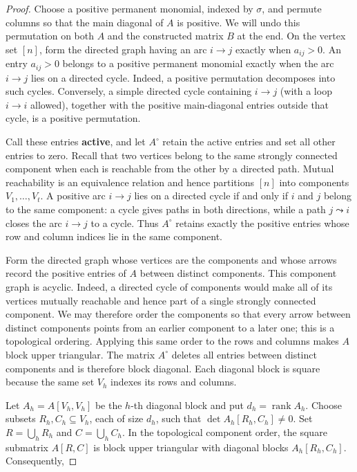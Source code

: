 \documentclass[11pt]{article}
\theoremstyle{remark}
\begin{document}
\begin{proof}
Choose a positive permanent monomial, indexed by \(\sigma\), and
permute columns so that the main diagonal of \(A\) is positive. We will undo
this permutation on both \(A\) and the constructed matrix \(B\) at the end.
On the vertex set \([n]\),
form the directed graph having an arc \(i\to j\) exactly when \(a_{ij}>0\). An entry
\(a_{ij}>0\) belongs to a positive permanent monomial exactly when the arc
\(i\to j\) lies on a directed cycle. Indeed, a positive permutation
decomposes into such cycles. Conversely, a simple directed cycle containing
\(i\to j\) (with a loop \(i\to i\) allowed), together with the positive
main-diagonal entries outside that cycle, is a positive permutation.

Call these entries \textbf{active}, and let \(A^\circ\) retain the active entries
and set all other entries to zero. Recall that two vertices belong to the
same strongly connected component when each is reachable from the other by
a directed path. Mutual reachability is an equivalence relation and hence
partitions \([n]\) into components \(V_1,\ldots,V_t\). A positive arc
\(i\to j\) lies on a directed cycle if and only if \(i\) and \(j\) belong
to the same component: a cycle gives paths in both directions, while a path
\(j\leadsto i\) closes the arc \(i\to j\) to a cycle. Thus \(A^\circ\)
retains exactly the positive entries whose row and column indices lie in the
same component.

Form the directed graph whose vertices are the components and whose arrows
record the positive entries of \(A\) between distinct components. This
component graph is acyclic. Indeed, a directed cycle of components would
make all of its vertices mutually reachable and hence part of a single
strongly connected component. We may therefore order the components so that
every arrow between distinct components points from an earlier component to
a later one; this is a topological ordering. Applying this same order to the
rows and columns makes \(A\) block upper triangular. The matrix \(A^\circ\)
deletes all entries between distinct components and is therefore block
diagonal. Each diagonal block is square because the same set \(V_h\) indexes
its rows and columns.

Let \(A_h=A[V_h,V_h]\) be the \(h\)-th diagonal block and put
\(d_h=\operatorname{rank}A_h\). Choose subsets \(R_h,C_h\subseteq V_h\),
each of size \(d_h\), such that
\(\det A_h[R_h,C_h]\ne0\). Set \(R=\bigcup_hR_h\) and
\(C=\bigcup_hC_h\). In the topological component order, the square submatrix
\(A[R,C]\) is block upper triangular with diagonal blocks
\(A_h[R_h,C_h]\). Consequently,


\end{proof}
\end{document}
